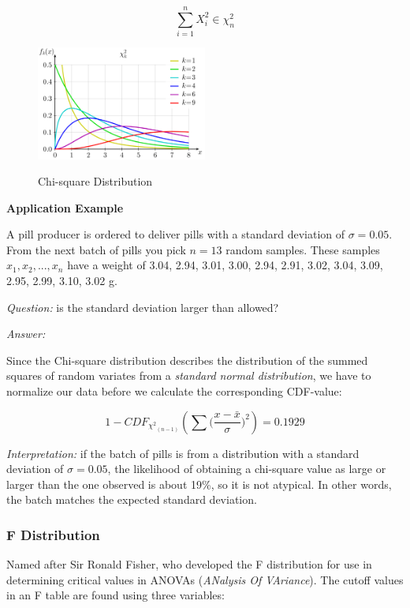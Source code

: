 \begin{equation}
    \sum\limits_{i = 1}^n {X_i^2} \in \chi_{n}^2
\end{equation}


\begin{figure}
  \centering
  \includegraphics[width=0.5\textwidth]{../Images/ChiSquare_pdf.png}\\
  \caption{Chi-square Distribution}
\end{figure}

\textbf{Application Example}

A pill producer is ordered to deliver pills with a standard deviation of $\sigma=0.05$. From the next batch of pills you pick $n=13$ random samples. These samples $x_1, x_2, . . . , x_n$ have a weight of
3.04, 2.94, 3.01, 3.00, 2.94, 2.91, 3.02, 3.04, 3.09, 2.95, 2.99, 3.10, 3.02 g.

\emph{Question:} is the standard deviation larger than allowed?

\emph{Answer:}

Since the Chi-square distribution describes the distribution of the summed squares of random variates from a \emph{standard normal distribution}, we have to normalize our data before we calculate the corresponding CDF-value:

\begin{equation}
  1 - CD{F_{{\chi ^2}_{(n - 1)}}}\left( {\sum {(\frac{{x - \bar x}}{\sigma }} {)^2}} \right) = 0.1929
\end{equation}

\emph{Interpretation:} if the batch of pills is from a distribution with a standard deviation of $\sigma=0.05$, the likelihood of obtaining a chi-square value as large or larger than the one observed is about 19\%, so it is not atypical. In other words, the batch matches the expected standard deviation.

\subsubsection{F Distribution}
Named after Sir Ronald Fisher, who developed the F distribution for use in determining critical values in ANOVAs (\emph{ANalysis Of VAriance}).  The cutoff values in an F table are found using three variables:

